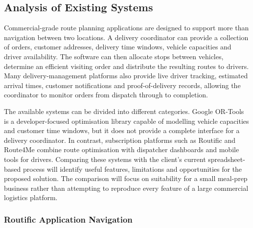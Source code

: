 \documentclass[11pt]{article}
\begin{document}
\subsection{Analysis of Existing Systems}
\label{sec:routific_analysis}
Commercial-grade route planning applications are designed to support more than navigation between two locations. A delivery coordinator can provide a collection of orders, customer addresses, delivery time windows, vehicle capacities and driver availability. The software can then allocate stops between vehicles, determine an efficient visiting order and distribute the resulting routes to drivers. Many delivery-management platforms also provide live driver tracking, estimated arrival times, customer notifications and proof-of-delivery records, allowing the coordinator to monitor orders from dispatch through to completion. \cite{routific_delivery_management,route4me_delivery_management}

The available systems can be divided into different categories. Google OR-Tools is a developer-focused optimisation library capable of modelling vehicle capacities and customer time windows, but it does not provide a complete interface for a delivery coordinator. \cite{google_ortools_routing} In contrast, subscription platforms such as Routific and Route4Me combine route optimisation with dispatcher dashboards and mobile tools for drivers. Comparing these systems with the client's current spreadsheet-based process will identify useful features, limitations and opportunities for the proposed solution. The comparison will focus on suitability for a small meal-prep business rather than attempting to reproduce every feature of a large commercial logistics platform.

\subsubsection{Routific Application Navigation}
\end{document}
